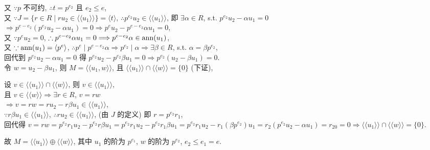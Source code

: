 \documentclass{note}
\begin{document}
\begin{pf}
    又 $\because p$ 不可约, $\therefore t=p^{e_2}$ 且 $e_2\leq e$,\\
    又 $\because J=\{r\in R\mid ru_2\in\langle\langle u_1\rangle\rangle\}=\langle t\rangle$, $\therefore p^{e_2}u_2\in\langle\langle u_1\rangle\rangle$, 即 $\exists\alpha\in R$, s.t. $p^{e_2}u_2-\alpha u_1=0$\\
    $\Longrightarrow p^{e-e_2}(p^{e_2}u_2-\alpha u_1)=0\Longrightarrow p^eu_2-p^{e-e_2}\alpha u_1=0$,\\
    又 $\because p^eu_2=0$, $\therefore p^{e-e_2}\alpha u_1=0\Longrightarrow p^{e-e_2}\alpha\in\operatorname{ann}(u_1)$,\\
    又 $\because\operatorname{ann}(u_1)=\langle p^e\rangle$, $\therefore p^e\mid p^{e-e_2}\alpha\Longrightarrow p^{e_2}\mid\alpha\Longrightarrow\exists\beta\in R$, s.t. $\alpha=\beta p^{e_2}$,\\
    回代到 $p^{e_2}u_2-\alpha u_1=0$ 得 $p^{e_2}u_2-p^{e_2}\beta u_1=0\Longrightarrow p^{e_2}(u_2-\beta u_1)=0$.\\
    令 $w=u_2-\beta u_1$, 则 $M=\langle\langle u_1,w\rangle\rangle$, 且 $\langle\langle u_1\rangle\rangle\cap\langle\langle w\rangle\rangle=\{0\}$ (下证),\\
    \begin{pf}
        设 $v\in\langle\langle u_1\rangle\rangle\cap\langle\langle w\rangle\rangle$, 则 $v\in\langle\langle u_1\rangle\rangle$,\\
        且 $v\in\langle\langle w\rangle\rangle\Longrightarrow\exists r\in R$, $v=rw$\\
        $\Longrightarrow v=rw=ru_2-r\beta u_1\in\langle\langle u_1\rangle\rangle$,\\
        $\because r\beta u_1\in\langle\langle u_1\rangle\rangle$, $\therefore ru_2\in\langle\langle u_1\rangle\rangle$, (由 $J$ 的定义) 即 $r=p^{e_2}r_1$,\\
        回代得 $v=rw=p^{e_2}r_1u_2-p^{e_2}r\beta u_1=p^{e_2}r_1u_2-p^{e_2}r_1\beta u_1=p^{e_2}r_1u_2-r_1(\beta p^{e_2})u_1=r_2(p^{e_2}u_2-\alpha u_1)=r_20=0\Longrightarrow \langle\langle u_1\rangle\rangle\cap\langle\langle w\rangle\rangle=\{0\}$.
    \end{pf}
    故 $M=\langle\langle u_1\rangle\rangle\oplus\langle\langle w\rangle\rangle$, 其中 $u_1$ 的阶为 $p^{e_1}$, $w$ 的阶为 $p^{e_2}$, $e_2\leq e_1=e$.
\end{pf}
\end{document}
